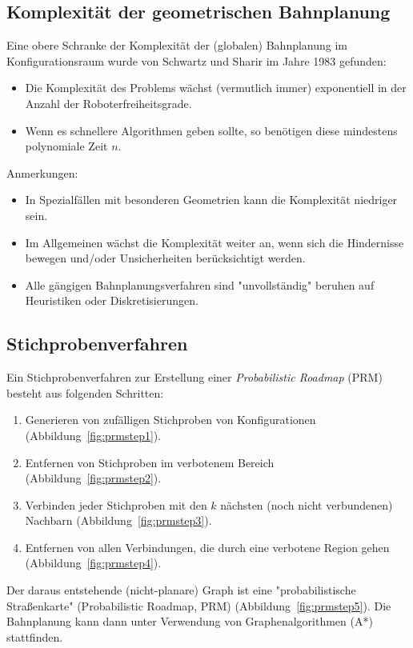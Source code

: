 		\subsection{Komplexität der geometrischen Bahnplanung}
			Eine obere Schranke der Komplexität der (globalen) Bahnplanung im Konfigurationsraum wurde von Schwartz und Sharir im Jahre 1983 gefunden:
			\begin{itemize}
				\item Die Komplexität des Problems wächst (vermutlich immer) exponentiell in der Anzahl der Roboterfreiheitsgrade.
				\item Wenn es schnellere Algorithmen geben sollte, so benötigen diese mindestens polynomiale Zeit \bzgl \(n\).
			\end{itemize}
		
			Anmerkungen:
			\begin{itemize}
				\item In Spezialfällen mit besonderen Geometrien kann die Komplexität niedriger sein.
				\item Im Allgemeinen wächst die Komplexität weiter an, wenn sich die Hindernisse bewegen und/oder Unsicherheiten berücksichtigt werden.
				\item Alle gängigen Bahnplanungsverfahren sind "unvollständig" \bzw beruhen auf Heuristiken oder Diskretisierungen.
			\end{itemize}

		\subsection{Stichprobenverfahren}
			Ein Stichprobenverfahren zur Erstellung einer \emph{Probabilistic Roadmap} (PRM) besteht aus folgenden Schritten:
			\begin{enumerate}
				\item Generieren von zufälligen Stichproben von Konfigurationen (Abbildung~\ref{fig:prmstep1}).
				\item Entfernen von Stichproben im verbotenem Bereich (Abbildung~\ref{fig:prmstep2}).
				\item Verbinden jeder Stichproben mit den \(k\) nächsten (noch nicht verbundenen) Nachbarn (Abbildung~\ref{fig:prmstep3}).
				\item Entfernen von allen Verbindungen, die durch eine verbotene Region gehen (Abbildung~\ref{fig:prmstep4}).
			\end{enumerate}
			Der daraus entstehende (\mglw nicht-planare) Graph ist eine "probabilistische Straßenkarte" (Probabilistic Roadmap, PRM) (Abbildung~\ref{fig:prmstep5}). Die Bahnplanung kann dann unter Verwendung von Graphenalgorithmen (\zB A*) stattfinden.

